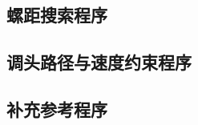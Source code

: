 \documentclass[bwprint]{cumcmthesis}
\begin{document}
\begin{appendices}
\subsection{螺距搜索程序}


\subsection{调头路径与速度约束程序}


\subsection{补充参考程序}

\end{appendices}
\end{document}
